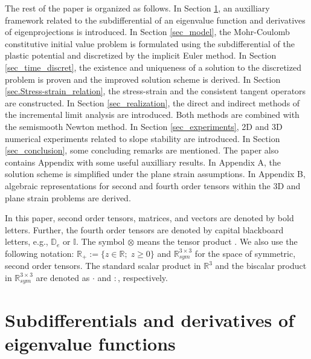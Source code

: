\documentclass[a4paper,12pt]{article}
\theoremstyle{remark}
\numberwithin{equation}{section}
\begin{document}
The rest of the paper is organized as follows. In Section \ref{sec_spectrum}, an auxilliary framework related to the subdifferential of an eigenvalue function and derivatives of eigenprojections is introduced. In Section \ref{sec_model}, the Mohr-Coulomb constitutive initial value problem is formulated using the subdifferential of the plastic potential and discretized by the implicit Euler method. In Section \ref{sec_time_discret}, the existence and uniqueness of a solution to the discretized problem is proven and the improved solution scheme is derived. In Section \ref{sec.Stress-strain_relation}, the stress-strain and the consistent tangent operators are constructed. In Section \ref{sec_realization}, the direct and indirect methods of the incremental limit analysis are introduced. Both methods are combined with the semismooth Newton method. In Section \ref{sec_experiments}, 2D and 3D numerical experiments related to slope stability are introduced. In Section \ref{sec_conclusion}, some concluding remarks are mentioned. The paper also contains Appendix with some useful auxilliary results. In Appendix A, the solution scheme is simplified under the plane strain assumptions. In Appendix B, algebraic representations for second and fourth order tensors within the 3D and plane strain problems are derived.

In this paper, second order tensors, matrices, and vectors are denoted by
bold letters.  Further, the fourth order tensors
are denoted by capital blackboard letters, e.g., $\mathbb D_e$ or $\mathbb
I$. The symbol $\otimes$ means the tensor product \cite{NPO08}. We also use the following
notation: $\mathbb R_+:=\{z\in\mathbb R;\; z\geq0\}$ and $\mathbb R^{3\times
3}_{sym}$ for the space of symmetric, second order tensors. The standard scalar product in $\mathbb R^{3}$ and the biscalar product in $\mathbb R^{3\times
3}_{sym}$ are denoted as $\cdot$ and $:$, respectively.


\section{Subdifferentials and derivatives of eigenvalue functions}
\label{sec_spectrum}
\end{document}

